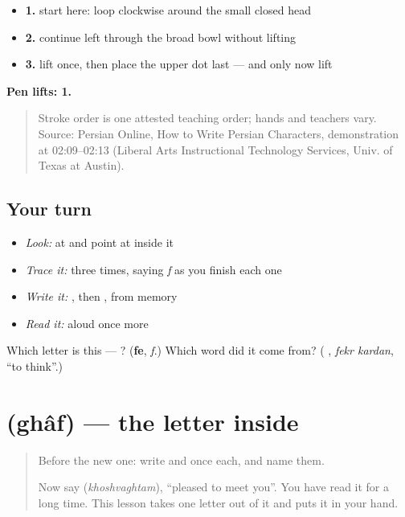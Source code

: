 \begin{itemize}
\raggedright
  \item \textbf{1.} start here: loop clockwise around the small closed head
  \item \textbf{2.} continue left through the broad bowl without lifting
  \item \textbf{3.} lift once, then place the upper dot last — and only now lift
\end{itemize}

\textbf{Pen lifts: 1.}

\begin{quote}
Stroke order is one attested teaching order; hands and teachers vary. Source: Persian Online, How to Write Persian Characters,  demonstration at 02:09–02:13 (Liberal Arts Instructional Technology Services, Univ. of Texas at Austin).
\end{quote}

\subsection*{Your turn}
\begin{itemize}
\raggedright
  \item \emph{Look:} at \textbf{ } and point at  inside it
  \item \emph{Trace it:}  three times, saying \emph{f} as you finish each one
  \item \emph{Write it:} , then , from memory
  \item \emph{Read it:} \textbf{ } aloud once more
\end{itemize}

\begin{tcolorbox}[breakable,colback=teal!4,colframe=teal!35!black,title={Before you move on}]
Which letter is this — ? (\textbf{fe}, \emph{f}.) Which word did it come from? (\textbf{ }, \emph{fekr kardan}, \textquotedblleft{}to think\textquotedblright{}.)
\end{tcolorbox}
\section[\texorpdfstring{\fa{ق} (ghâf)}{ق (ghâf)}]{ (ghâf) — the letter inside }

\label{lesson:FA-W26-ghaf}



\begin{quote}
Before the new one: write  and  once each, and name them.

Now say \textbf{} (\emph{khoshvaghtam}), \textquotedblleft{}pleased to meet you\textquotedblright{}. You have read it for a long time. This lesson takes one letter out of it and puts it in your hand.
\end{quote}

